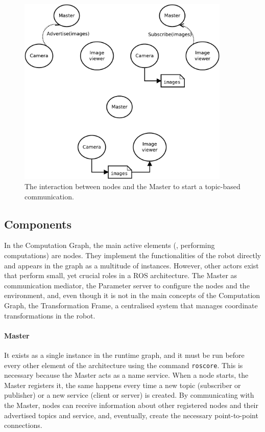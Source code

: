 \begin{figure}[t]
    \centering
    \includegraphics[width=0.9\textwidth]{gfx/ros/master_t}
    \caption{The interaction between nodes and the Master to start a topic-based communication.}\label{fig:ros-master}
\end{figure}

\subsection{Components}
In the Computation Graph, the main active elements (\ie, performing computations) are nodes. They implement the functionalities of the robot directly and appears in the graph as a multitude of instances. However, other actors exist that perform small, yet crucial roles in a ROS architecture. The Master as communication mediator, the Parameter server to configure the nodes and the environment, and, even though it is not in the main concepts of the Computation Graph, the Transformation Frame, a centralised system that manages coordinate transformations in the robot.

\paragraph{Master} It exists as a single instance in the runtime graph, and it must be run before every other element of the architecture using the command \texttt{roscore}. This is necessary because the Master acts as a name service. When a node starts, the Master registers it, the same happens every time a new topic (subscriber or publisher) or a new service (client or server) is created. By communicating with the Master, nodes can receive information about other registered nodes and their advertised topics and service, and, eventually, create the necessary point-to-point connections.

